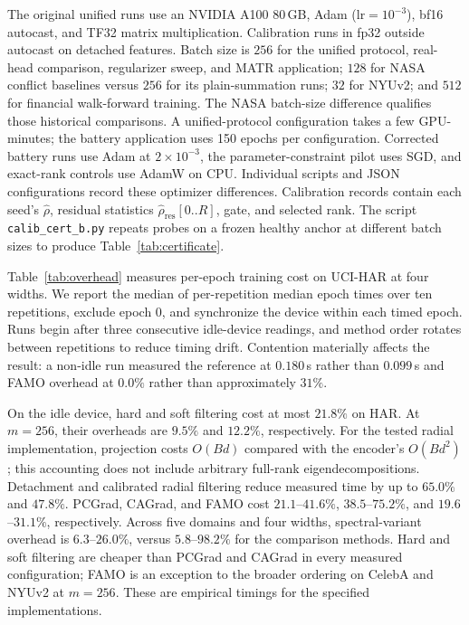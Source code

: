 \documentclass{article}
\begin{document}
The original unified runs use an NVIDIA A100 80\,GB, Adam ($\mathrm{lr}=10^{-3}$), bf16 autocast, and TF32 matrix multiplication. Calibration runs in fp32 outside autocast on detached features. Batch size is $256$ for the unified protocol, real-head comparison, regularizer sweep, and MATR application; $128$ for NASA conflict baselines versus $256$ for its plain-summation runs; $32$ for NYUv2; and $512$ for financial walk-forward training. The NASA batch-size difference qualifies those historical comparisons.
A unified-protocol configuration takes a few GPU-minutes; the battery application uses 150 epochs per configuration. Corrected battery runs use Adam at $2\times10^{-3}$, the parameter-constraint pilot uses SGD, and exact-rank controls use AdamW on CPU. Individual scripts and JSON configurations record these optimizer differences.
Calibration records contain each seed's $\hat\rho$, residual statistics $\hat\rho_{\mathrm{res}}[0..R]$, gate, and selected rank. The script \texttt{calib\_cert\_b.py} repeats probes on a frozen healthy anchor at different batch sizes to produce Table~\ref{tab:certificate}.

Table~\ref{tab:overhead} measures per-epoch training cost on UCI-HAR at four widths. We report the median of per-repetition median epoch times over ten repetitions, exclude epoch 0, and synchronize the device within each timed epoch. Runs begin after three consecutive idle-device readings, and method order rotates between repetitions to reduce timing drift. Contention materially affects the result: a non-idle run measured the reference at $0.180$\,s rather than $0.099$\,s and FAMO overhead at $0.0\%$ rather than approximately $31\%$.

On the idle device, hard and soft filtering cost at most $21.8\%$ on HAR. At $m=256$, their overheads are $9.5\%$ and $12.2\%$, respectively. For the tested radial implementation, projection costs $O(Bd)$ compared with the encoder's $O(Bd^2)$; this accounting does not include arbitrary full-rank eigendecompositions. Detachment and calibrated radial filtering reduce measured time by up to $65.0\%$ and $47.8\%$. PCGrad, CAGrad, and FAMO cost $21.1$--$41.6\%$, $38.5$--$75.2\%$, and $19.6$--$31.1\%$, respectively. Across five domains and four widths, spectral-variant overhead is $6.3$--$26.0\%$, versus $5.8$--$98.2\%$ for the comparison methods. Hard and soft filtering are cheaper than PCGrad and CAGrad in every measured configuration; FAMO is an exception to the broader ordering on CelebA and NYUv2 at $m=256$. These are empirical timings for the specified implementations.
\end{document}
